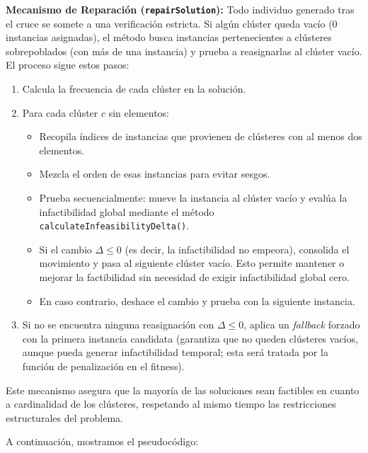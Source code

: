\documentclass[a4paper,12pt]{article}%
\begin{document}
\noindent\textbf{Mecanismo de Reparación (\texttt{repairSolution}):}
Todo individuo generado tras el cruce se somete a una verificación estricta. Si algún clúster queda vacío (0 instancias asignadas), el método busca instancias pertenecientes a clústeres sobrepoblados (con más de una instancia) y prueba a reasignarlas al clúster vacío. El proceso sigue estos pasos:

\begin{enumerate}
	\item Calcula la frecuencia de cada clúster en la solución.
	\item Para cada clúster $c$ sin elementos:
	\begin{itemize}
		\item Recopila índices de instancias que provienen de clústeres con al menos dos elementos.
		\item Mezcla el orden de esas instancias para evitar sesgos.
		\item Prueba secuencialmente: mueve la instancia al clúster vacío y evalúa la infactibilidad global mediante el método \texttt{calculateInfeasibilityDelta()}.
		\item Si el cambio $\Delta \leq 0$ (es decir, la infactibilidad no empeora), consolida el movimiento y pasa al siguiente clúster vacío. Esto permite mantener o mejorar la factibilidad sin necesidad de exigir infactibilidad global cero.
		\item En caso contrario, deshace el cambio y prueba con la siguiente instancia.
	\end{itemize}
	\item Si no se encuentra ninguna reasignación con $\Delta\leq0$, aplica un \textit{fallback} forzado con la primera instancia candidata (garantiza que no queden clústeres vacíos, aunque pueda generar infactibilidad temporal; esta será tratada por la función de penalización en el fitness).
\end{enumerate}

Este mecanismo asegura que la mayoría de las soluciones sean factibles en cuanto a cardinalidad de los clústeres, respetando al mismo tiempo las restricciones estructurales del problema.

A continuación, mostramos el pseudocódigo:
\end{document}
